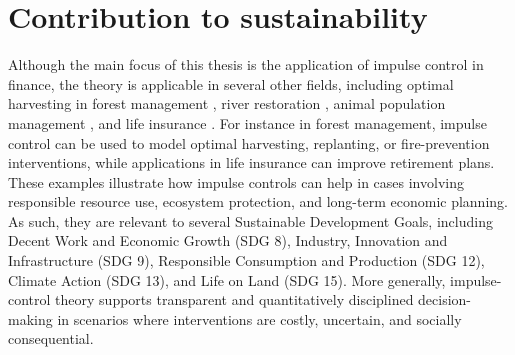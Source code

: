 \section*{Contribution to sustainability}
Although the main focus of this thesis is the application of impulse control in finance, the theory is applicable in several other fields, including optimal harvesting in forest management \cite{ieda2015implicit}, river restoration \cite{YOSHIOKA20192182}, animal population management \cite{yaegashi2019exact}, and life insurance \cite{azimzadeh2018impulsecontrolfinancenumerical, lu2024semi}. For instance in forest management, impulse control can be used to model optimal harvesting, replanting, or fire-prevention interventions, while applications in life insurance can improve retirement plans. These examples illustrate how impulse controls can help in cases involving responsible resource use, ecosystem protection, and long-term economic planning. As such, they are relevant to several Sustainable Development Goals, including Decent Work and Economic Growth (SDG 8), Industry, Innovation and Infrastructure (SDG 9), Responsible Consumption and Production (SDG 12), Climate Action (SDG 13), and Life on Land (SDG 15). More generally, impulse-control theory supports transparent and quantitatively disciplined decision-making in scenarios where interventions are costly, uncertain, and socially consequential.

